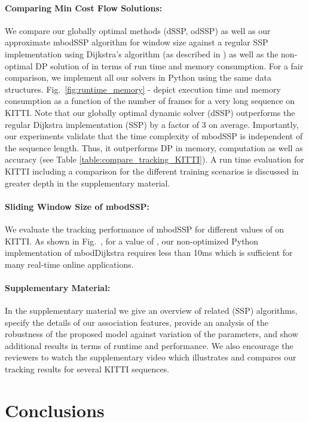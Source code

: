 \documentclass[10pt,twocolumn,letterpaper]{article}
\newcommand{\figref}[1]{Fig.~\ref{#1}}
\newcommand{\subfigref}[1]{Fig.~\subref*{#1}}
\begin{document}
\paragraph{Comparing Min Cost Flow Solutions:}
We compare our globally optimal methods (dSSP, odSSP) as well as our approximate mbodSSP algorithm for window size  against a regular SSP implementation using Dijkstra's algorithm (as described in \cite{Cormen2001}) as well as the non-optimal DP solution of\cite{Pirsiavash2011CVPR} in terms of run time and memory consumption. 
For a fair comparison, we implement all our solvers in Python using the same data structures. 
\figref{fig:runtime_memory} - depict execution time and memory consumption as a function of the number of frames for a very long sequence on KITTI. 
Note that our globally optimal dynamic solver (dSSP) outperforms the regular Dijkstra implementation (SSP) by a factor of 3 on average.  
Importantly, our experiments validate that the time complexity of mbodSSP is independent of the sequence length. Thus, it outperforms DP \cite{Pirsiavash2011CVPR} in memory, computation as well as accuracy (see Table \ref{table:compare_tracking_KITTI}).
A run time evaluation for  KITTI  including a comparison for the different training scenarios is discussed in greater depth in the supplementary material.

\paragraph{Sliding Window Size of mbodSSP:}
We evaluate the tracking performance of mbodSSP for different values of   on  KITTI. 
As shown in \subfigref{fig:runtime_memory:history},  for a value of , our non-optimized Python implementation of mbodDijkstra requires less than 10ms which is sufficient for many real-time online applications.

\paragraph{Supplementary Material:}
In the supplementary material we give an overview of related (SSP) algorithms, specify the details of our association features, provide an analysis of the robustness of the proposed model against variation of the parameters, and show additional results in terms of runtime and performance. We also encourage the reviewers to watch the supplementary video which illustrates and compares our tracking results for several KITTI sequences. \section{Conclusions}
\end{document}

